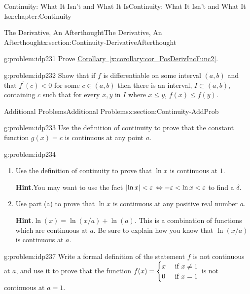 \begin{chapterptx}{Continuity: What It Isn't and What It Is}{}{Continuity: What It Isn't and What It Is}{}{}{x:chapter:Continuity}
\begin{sectionptx}{The Derivative, An Afterthought}{}{The Derivative, An Afterthought}{}{}{x:section:Continuity-DerivativeAfterthought}
\begin{problem}{}{g:problem:idp231}
			 Prove \hyperref[x:corollary:cor_PosDerivIncFunc2]{Corollary~{\xreffont\ref{x:corollary:cor_PosDerivIncFunc2}}}.%
		\end{problem}
		\begin{problem}{}{g:problem:idp232}%
			 Show that if \(f\) is differentiable on some interval \((a,b)\) and that \(f^\prime(c)\lt 0\) for some \(c\in (a,b)\) then there is an interval, \(I\subset (a,b)\), containing \(c\) such that for every \(x, y\) in \(I\) where \(x\le y\), \(f(x)\le f(y)\).%
		\end{problem}
	\end{sectionptx}
	\typeout{************************************************}
	\typeout{************************************************}
	\begin{sectionptx}{Additional Problems}{}{Additional Problems}{}{}{x:section:Continuity-AddProb}
		\begin{problem}{}{g:problem:idp233}%
			Use the definition of continuity to prove that the constant function \(g(x)=c\) is continuous at any point \(a\).%
		\end{problem}
		\begin{problem}{}{g:problem:idp234}%
			\begin{enumerate}[font=\bfseries,label=(\alph*),ref=\alph*]
				\item{}Use the definition of continuity to prove that \(\ln x\) is continuous at \(1\).%
				\par\smallskip%
				\noindent\textbf{\blocktitlefont Hint}.\hypertarget{g:hint:idp235}{}\quad{}You may want to use the fact \(\left|\ln x\right|< \varepsilon\,\Leftrightarrow-\varepsilon< \ln x< \varepsilon\) to find a \(\delta\).%
				\item{}Use part (a) to prove that \(\ln x\) is continuous at any positive real number \(a\).%
				\par\smallskip%
				\noindent\textbf{\blocktitlefont Hint}.\hypertarget{g:hint:idp236}{}\quad{}\(\ln(x)=\ln(x/a)+\ln(a)\). This is a combination of functions which are continuous at \(a\). Be sure to explain how you know that \(\ln(x/a)\) is continuous at \(a\).%
			\end{enumerate}
		\end{problem}
		\begin{problem}{}{g:problem:idp237}%
			 Write a formal definition of the statement \(f\) is not continuous at \(a\), and use it to prove that the function \(f(x)= \begin{cases}x& \text{ if } x\neq 1\\ 0& \text{ if } x=1 \end{cases}\) is not continuous at \(a=1\).%

\end{problem}
\end{sectionptx}
\end{chapterptx}
